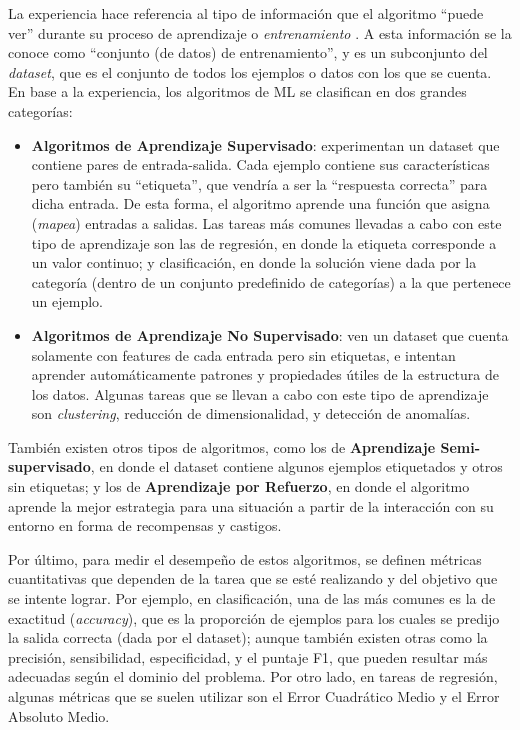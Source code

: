 \documentclass[../../main.tex]{subfiles}
\begin{document}
La experiencia hace referencia al tipo de información que el algoritmo ``puede ver''
durante su proceso de aprendizaje o \textit{entrenamiento} \cite{hands-on-ML-sklearn-tf}.
A esta información se la conoce como ``conjunto (de datos) de entrenamiento'', y es un
subconjunto del \textit{dataset}, que es el conjunto de todos los ejemplos o datos con los
que se cuenta. En base a la experiencia, los algoritmos de ML se clasifican en dos grandes
categorías:
\begin{itemize}
    \item \textbf{Algoritmos de Aprendizaje Supervisado}: experimentan un dataset que
    contiene pares de entrada-salida. Cada ejemplo contiene sus características pero
    también su ``etiqueta'', que vendría a ser la ``respuesta correcta'' para dicha
    entrada. De esta forma, el algoritmo aprende una función que asigna (\textit{mapea})
    entradas a salidas. Las tareas más comunes llevadas a cabo con este tipo de
    aprendizaje son las de regresión, en donde la etiqueta corresponde a un valor
    continuo; y clasificación, en donde la solución viene dada por la categoría (dentro de
    un conjunto predefinido de categorías) a la que pertenece un ejemplo.
    \item \textbf{Algoritmos de Aprendizaje No Supervisado}: ven un dataset que cuenta
    solamente con features de cada entrada pero sin etiquetas, e intentan aprender
    automáticamente patrones y propiedades útiles de la estructura de los datos. Algunas
    tareas que se llevan a cabo con este tipo de aprendizaje son \textit{clustering},
    reducción de dimensionalidad, y detección de anomalías.
\end{itemize}
También existen otros tipos de algoritmos, como los de \textbf{Aprendizaje
Semi-supervisado}, en donde el dataset contiene algunos ejemplos etiquetados y otros sin
etiquetas; y los de \textbf{Aprendizaje por Refuerzo}, en donde el algoritmo aprende la
mejor estrategia para una situación a partir de la interacción con su entorno en forma de
recompensas y castigos.

Por último, para medir el desempeño de estos algoritmos, se definen métricas cuantitativas
que dependen de la tarea que se esté realizando y del objetivo que se intente lograr. Por
ejemplo, en clasificación, una de las más comunes es la de exactitud (\textit{accuracy}),
que es la proporción de ejemplos para los cuales se predijo la salida correcta (dada por
el dataset); aunque también existen otras como la precisión, sensibilidad, especificidad,
y el puntaje F1, que pueden resultar más adecuadas según el dominio del
problema. Por otro lado, en tareas de regresión, algunas métricas que se suelen
utilizar son el Error Cuadrático Medio y el Error Absoluto Medio.
\end{document}
